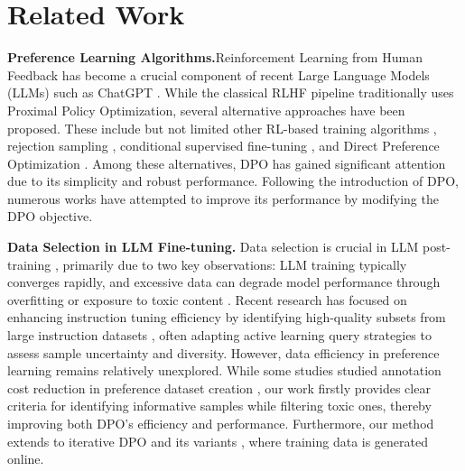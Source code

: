 \section{Related Work}
\label{sec:rel}

\textbf{Preference Learning Algorithms.}Reinforcement Learning from Human Feedback %
has become a crucial component of recent Large Language Models (LLMs) such as ChatGPT \citep{ouyang2022training}. While the classical RLHF pipeline traditionally uses Proximal Policy Optimization, several alternative approaches have been proposed. These include but not limited other RL-based training algorithms \citep{li2023remax,zhong2024dpo}, rejection sampling \citep{dong2023raft,gulcehre2023reinforced}, conditional supervised fine-tuning \citep{lu2022quark,yang2024rewards,zhang2024reward}, and Direct Preference Optimization \citep{rafailov2024direct}. Among these alternatives, DPO has gained significant attention due to its simplicity and robust performance. Following the introduction of DPO, numerous works \citep{zhao2023slic,azar2024general,ethayarajh2024kto,meng2024simpo,tang2024generalized,han2024f,xu2024contrastive,hong2024orpo,park2024disentangling} have attempted to improve its performance by modifying the DPO objective.

\textbf{Data Selection in LLM Fine-tuning.} Data selection is crucial in LLM post-training \citep{wang2024survey}, primarily due to two key observations: LLM training typically converges rapidly, and excessive data can degrade model performance through overfitting or exposure to toxic content \citep{swayamdipta2020dataset,deng2023counterfactual}. Recent research has focused on enhancing instruction tuning efficiency by identifying high-quality subsets from large instruction datasets \citep{cao2023instruction,li2024superfiltering,xia2024less}, often adapting active learning query strategies \citep{ren2021survey} to assess sample uncertainty and diversity. However, data efficiency in preference learning remains relatively unexplored. While some studies studied annotation cost reduction in preference dataset creation \citep{muldrew2024active, yasunaga2024alma}, our work firstly provides clear criteria for identifying informative samples while filtering toxic ones, thereby improving both DPO's efficiency and performance. Furthermore, our method extends to iterative DPO \citep{xiong2024iterative} and its variants \citep{zhang2024self}, where training data is generated online.